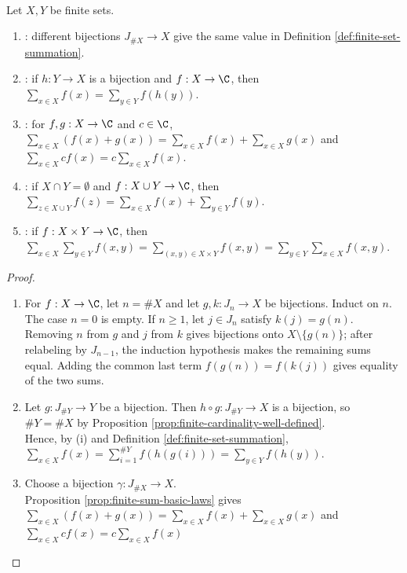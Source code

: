 \begin{proposition} \label{prop:finite-set-summation-laws} \\
Let $X,Y$ be finite sets.
\begin{enumerate}[label=(\roman*)]
\setlength{\itemsep}{0pt}
\item {}: different bijections $J_{\#X}\to X$ give the same value in Definition \ref{def:finite-set-summation}.
\item {}: if $h:Y\to X$ is a bijection and $f:X\to\C$, then $\sum\limits_{x\in X}f(x)=\sum\limits_{y\in Y}f(h(y))$.
\item {}: for $f,g:X\to\C$ and $c\in\C$, $\sum\limits_{x\in X}(f(x)+g(x))=\sum\limits_{x\in X}f(x)+\sum\limits_{x\in X}g(x)$ and $\sum\limits_{x\in X}cf(x)=c\sum\limits_{x\in X}f(x)$.
\item {}: if $X\cap Y=\emptyset$ and $f:X\cup Y\to\C$, then $\sum\limits_{z\in X\cup Y}f(z)=\sum\limits_{x\in X}f(x)+\sum\limits_{y\in Y}f(y)$.
\item {}: if $f:X\times Y\to\C$, then $\sum\limits_{x\in X}\sum\limits_{y\in Y}f(x,y)=\sum\limits_{(x,y)\in X\times Y}f(x,y)=\sum\limits_{y\in Y}\sum\limits_{x\in X}f(x,y)$.
\end{enumerate}
\begin{proof}
\begin{enumerate}[label=(\roman*)]
\setlength{\itemsep}{0pt}
\item For $f:X\to\C$, let $n=\#X$ and let $g,k:J_n\to X$ be bijections. Induct on $n$. The case $n=0$ is empty. If $n\geq1$, let $j\in J_n$ satisfy $k(j)=g(n)$. Removing $n$ from $g$ and $j$ from $k$ gives bijections onto $X\setminus\{g(n)\}$; after relabeling by $J_{n-1}$, the induction hypothesis makes the remaining sums equal. Adding the common last term $f(g(n))=f(k(j))$ gives equality of the two sums.
\item Let $g:J_{\#Y}\to Y$ be a bijection. Then $h\circ g:J_{\#Y}\to X$ is a bijection, so $\#Y=\#X$ by Proposition \ref{prop:finite-cardinality-well-defined}.\\
Hence, by (i) and Definition \ref{def:finite-set-summation}, $\sum\limits_{x\in X}f(x)=\sum\limits_{i=1}^{\#Y}f(h(g(i)))=\sum\limits_{y\in Y}f(h(y))$.
\item Choose a bijection $\gamma:J_{\#X}\to X$.\\
Proposition \ref{prop:finite-sum-basic-laws} gives $\sum\limits_{x\in X}(f(x)+g(x)) =\sum\limits_{x\in X}f(x)+\sum\limits_{x\in X}g(x)$ and $\sum\limits_{x\in X}cf(x)=c\sum\limits_{x\in X}f(x)$

\end{enumerate}
\end{proof}
\end{proposition}
